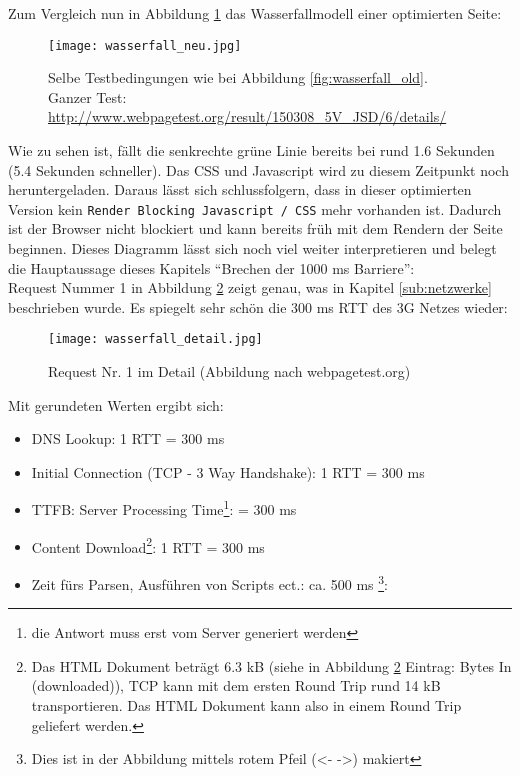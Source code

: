 	  Zum Vergleich nun in Abbildung \ref{fig:wasserfall_neu} das Wasserfallmodell einer optimierten Seite:

	  \begin{figure}[htbp]
	  	\begin{center}
	  		\texttt{[image: wasserfall\_neu.jpg]}
	  		\caption{Selbe Testbedingungen wie bei Abbildung \ref{fig:wasserfall_old}. Ganzer Test: \url{http://www.webpagetest.org/result/150308_5V_JSD/6/details/}}
	  		\label{fig:wasserfall_neu}
	  	\end{center}
	  \end{figure}
	  Wie zu sehen ist, fällt die senkrechte grüne Linie bereits bei rund 1.6 Sekunden (5.4 Sekunden schneller). Das CSS und Javascript wird zu diesem Zeitpunkt noch heruntergeladen. Daraus lässt sich schlussfolgern, dass in dieser optimierten Version kein \texttt{Render Blocking Javascript / CSS} mehr vorhanden ist. Dadurch ist der Browser nicht blockiert und kann bereits früh mit dem Rendern der Seite beginnen. Dieses Diagramm lässt sich noch viel weiter interpretieren und belegt die Hauptaussage dieses Kapitels "`Brechen der 1000 ms Barriere"':\\
	  Request Nummer 1 in Abbildung \ref{fig:wasserfall_detail} zeigt genau, was in Kapitel \ref{sub:netzwerke} beschrieben wurde. Es spiegelt sehr schön die 300 ms RTT des 3G Netzes wieder:
	  
	  \begin{figure}[htbp]
	  	\begin{center}
	  		\texttt{[image: wasserfall\_detail.jpg]}
	  		\caption{Request Nr. 1 im Detail (Abbildung nach webpagetest.org)}
	  		\label{fig:wasserfall_detail}
	  	\end{center}
	  \end{figure} 
	  
	  Mit gerundeten Werten ergibt sich:

	  \begin{itemize}
	  	\item DNS Lookup: 1 RTT = 300 ms
	  	\item Initial Connection (TCP - 3 Way Handshake): 1 RTT = 300 ms
	  	\item TTFB: Server Processing Time\footnote{die Antwort muss erst vom Server generiert werden}: = 300 ms
	  	\item Content Download\footnote{Das HTML Dokument beträgt 6.3 kB (siehe in Abbildung \ref{fig:wasserfall_detail} Eintrag: Bytes In (downloaded)), TCP kann mit dem ersten Round Trip rund 14 kB transportieren. Das HTML Dokument kann also in einem Round Trip geliefert werden.}: 1 RTT = 300 ms 
	  	\item Zeit fürs Parsen, Ausführen von Scripts ect.: ca. 500 ms \footnote{Dies ist in der Abbildung mittels rotem Pfeil (<- ->) makiert}:  
	  \end{itemize}
 
